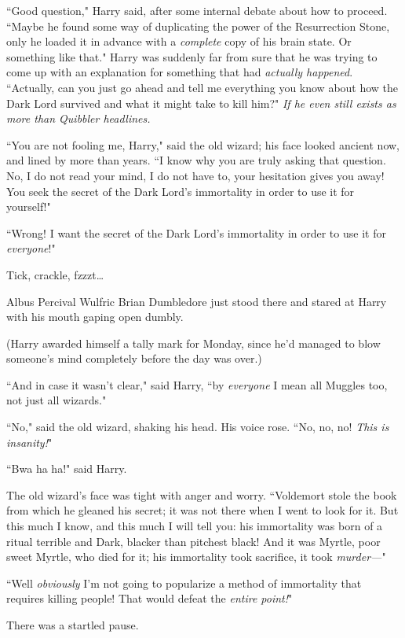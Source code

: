 ``Good question," Harry said, after some internal debate about how to proceed. ``Maybe he found some way of duplicating the power of the Resurrection Stone, only he loaded it in advance with a \emph{complete} copy of his brain state. Or something like that." Harry was suddenly far from sure that he was trying to come up with an explanation for something that had \emph{actually happened}. ``Actually, can you just go ahead and tell me everything you know about how the Dark Lord survived and what it might take to kill him?" \emph{If he even still exists as more than Quibbler headlines.}

``You are not fooling me, Harry," said the old wizard; his face looked ancient now, and lined by more than years. ``I know why you are truly asking that question. No, I do not read your mind, I do not have to, your hesitation gives you away! You seek the secret of the Dark Lord's immortality in order to use it for yourself!"

``Wrong! I want the secret of the Dark Lord's immortality in order to use it for \emph{everyone}!"

\later

Tick, crackle, fzzzt{\ldots}

Albus Percival Wulfric Brian Dumbledore just stood there and stared at Harry with his mouth gaping open dumbly.

(Harry awarded himself a tally mark for Monday, since he'd managed to blow someone's mind completely before the day was over.)

``And in case it wasn't clear," said Harry, ``by \emph{everyone} I mean all Muggles too, not just all wizards."

``No," said the old wizard, shaking his head. His voice rose. ``No, no, no! \emph{This is insanity!}"

``Bwa ha ha!" said Harry.

The old wizard's face was tight with anger and worry. ``Voldemort stole the book from which he gleaned his secret; it was not there when I went to look for it. But this much I know, and this much I will tell you: his immortality was born of a ritual terrible and Dark, blacker than pitchest black! And it was Myrtle, poor sweet Myrtle, who died for it; his immortality took sacrifice, it took \emph{murder—}"

``Well \emph{obviously} I'm not going to popularize a method of immortality that requires killing people! That would defeat the \emph{entire point!}"

There was a startled pause.

